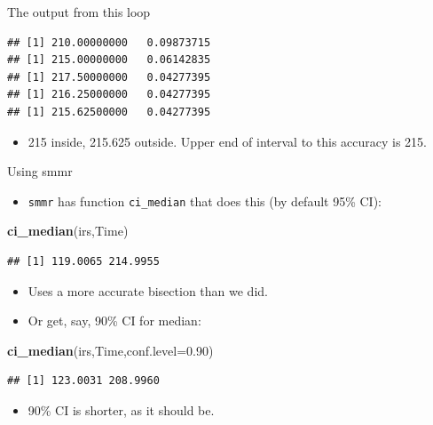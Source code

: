 \documentclass[ignorenonframetext,]{beamer}
\newenvironment{Shaded}{\begin{snugshade}}{\end{snugshade}}
\newcommand{\DataTypeTok}[1]{\textcolor[rgb]{0.13,0.29,0.53}{#1}}
\newcommand{\FloatTok}[1]{\textcolor[rgb]{0.00,0.00,0.81}{#1}}
\newcommand{\KeywordTok}[1]{\textcolor[rgb]{0.13,0.29,0.53}{\textbf{#1}}}
\newcommand{\NormalTok}[1]{#1}
\providecommand{\tightlist}{%
  \setlength{\itemsep}{0pt}\setlength{\parskip}{0pt}}
\begin{document}
\begin{frame}[fragile]{The output from this loop}
\protect\hypertarget{the-output-from-this-loop}{}

\begin{verbatim}
## [1] 210.00000000   0.09873715
## [1] 215.00000000   0.06142835
## [1] 217.50000000   0.04277395
## [1] 216.25000000   0.04277395
## [1] 215.62500000   0.04277395
\end{verbatim}

\begin{itemize}
\tightlist
\item
  215 inside, 215.625 outside. Upper end of interval to this accuracy is
  215.
\end{itemize}

\end{frame}

\begin{frame}[fragile]{Using smmr}
\protect\hypertarget{using-smmr}{}

\begin{itemize}
\tightlist
\item
  \texttt{smmr} has function \texttt{ci\_median} that does this (by
  default 95\% CI):
\end{itemize}

\begin{Shaded}
\begin{Highlighting}[]
\KeywordTok{ci_median}\NormalTok{(irs,Time)}
\end{Highlighting}
\end{Shaded}

\begin{verbatim}
## [1] 119.0065 214.9955
\end{verbatim}

\begin{itemize}
\tightlist
\item
  Uses a more accurate bisection than we did.
\item
  Or get, say, 90\% CI for median:
\end{itemize}

\begin{Shaded}
\begin{Highlighting}[]
\KeywordTok{ci_median}\NormalTok{(irs,Time,}\DataTypeTok{conf.level=}\FloatTok{0.90}\NormalTok{)}
\end{Highlighting}
\end{Shaded}

\begin{verbatim}
## [1] 123.0031 208.9960
\end{verbatim}

\begin{itemize}
\tightlist
\item
  90\% CI is shorter, as it should be.
\end{itemize}

\end{frame}
\end{document}
